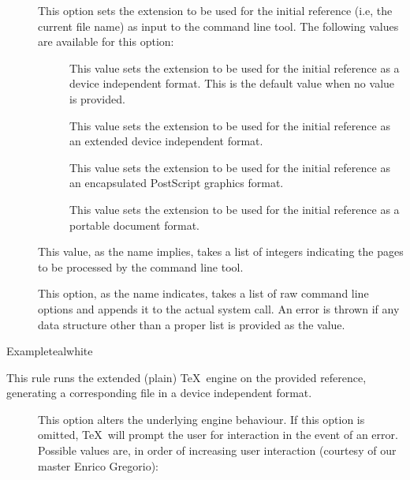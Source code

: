 \begin{description}
\begin{description}
\item[] This option sets the extension to be used for the initial reference (i.e, the current file name) as input to the command line tool. The following values are available for this option:

\begin{description}
\item[] This value sets the extension to be used for the initial reference as a device independent format. This is the default value when no value is provided.

\item[] This value sets the extension to be used for the initial reference as an extended device independent format.

\item[] This value sets the extension to be used for the initial reference as an encapsulated PostScript graphics format.

\item[] This value sets the extension to be used for the initial reference as a portable document format.
\end{description}

\item[] This value, as the name implies, takes a list of integers indicating the pages to be processed by the command line tool.

\item[] This option, as the name indicates, takes a list of raw command line options and appends it to the actual system call. An error is thrown if any data structure other than a proper list is provided as the value.
\end{description}

\begin{codebox}{Example}{teal}{\icnote}{white}
\end{codebox}

\item[\rulebox{etex}]
This rule runs the  extended (plain) \TeX\ engine on the provided  reference, generating a corresponding file in a device independent format.

\begin{description}
\item[] This option alters the underlying engine behaviour. If this option is omitted, \TeX\ will prompt the user for interaction in the event of an error. Possible values are, in order of increasing user interaction (courtesy of our master Enrico Gregorio):


\end{description}
\end{description}
